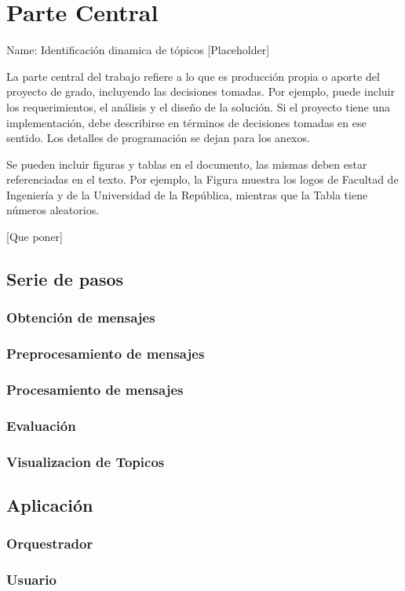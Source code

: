 \chapter{Parte Central}
Name: Identificación dinamica de tópicos
[Placeholder]

La parte central del trabajo refiere a lo que es producción propia o aporte del
proyecto de grado, incluyendo las decisiones tomadas. Por ejemplo, puede incluir
los requerimientos, el análisis y el diseño de la solución. Si el proyecto tiene una
implementación, debe describirse en términos de decisiones tomadas en ese sentido.
Los detalles de programación se dejan para los anexos.

Se pueden incluir figuras y tablas en el documento, las mismas deben estar referenciadas en el texto. Por ejemplo, la Figura muestra los logos de Facultad de Ingeniería y de la Universidad de la República, mientras que la Tabla tiene números aleatorios.

[Que poner]

\section{Serie de pasos}

\subsection{Obtención de mensajes}

\subsection{Preprocesamiento de mensajes}

\subsection{Procesamiento de mensajes}

\subsection{Evaluación}

\subsection{Visualizacion de Topicos}


\section{Aplicación}

\subsection{Orquestrador}

\subsection{Usuario}
